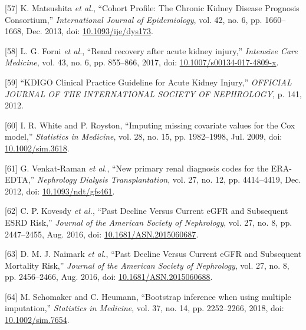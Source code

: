 \documentclass[
]{article}
\newenvironment{cslreferences}%
  {}%
  {\par}
\begin{document}
\begin{cslreferences}
\leavevmode\hypertarget{ref-matsushita_cohort_2013}{}%
{[}57{]} K. Matsushita \emph{et al.}, ``Cohort Profile: The Chronic Kidney Disease Prognosis Consortium,'' \emph{International Journal of Epidemiology}, vol. 42, no. 6, pp. 1660--1668, Dec. 2013, doi: \href{https://doi.org/10.1093/ije/dys173}{10.1093/ije/dys173}.

\leavevmode\hypertarget{ref-forni_renal_2017-1}{}%
{[}58{]} L. G. Forni \emph{et al.}, ``Renal recovery after acute kidney injury,'' \emph{Intensive Care Medicine}, vol. 43, no. 6, pp. 855--866, 2017, doi: \href{https://doi.org/10.1007/s00134-017-4809-x}{10.1007/s00134-017-4809-x}.

\leavevmode\hypertarget{ref-noauthor_kdigo_2012}{}%
{[}59{]} ``KDIGO Clinical Practice Guideline for Acute Kidney Injury,'' \emph{OFFICIAL JOURNAL OF THE INTERNATIONAL SOCIETY OF NEPHROLOGY}, p. 141, 2012.

\leavevmode\hypertarget{ref-white_imputing_2009}{}%
{[}60{]} I. R. White and P. Royston, ``Imputing missing covariate values for the Cox model,'' \emph{Statistics in Medicine}, vol. 28, no. 15, pp. 1982--1998, Jul. 2009, doi: \href{https://doi.org/10.1002/sim.3618}{10.1002/sim.3618}.

\leavevmode\hypertarget{ref-venkat-raman_new_2012}{}%
{[}61{]} G. Venkat-Raman \emph{et al.}, ``New primary renal diagnosis codes for the ERA-EDTA,'' \emph{Nephrology Dialysis Transplantation}, vol. 27, no. 12, pp. 4414--4419, Dec. 2012, doi: \href{https://doi.org/10.1093/ndt/gfs461}{10.1093/ndt/gfs461}.

\leavevmode\hypertarget{ref-kovesdy_past_2016}{}%
{[}62{]} C. P. Kovesdy \emph{et al.}, ``Past Decline Versus Current eGFR and Subsequent ESRD Risk,'' \emph{Journal of the American Society of Nephrology}, vol. 27, no. 8, pp. 2447--2455, Aug. 2016, doi: \href{https://doi.org/10.1681/ASN.2015060687}{10.1681/ASN.2015060687}.

\leavevmode\hypertarget{ref-naimark_past_2016}{}%
{[}63{]} D. M. J. Naimark \emph{et al.}, ``Past Decline Versus Current eGFR and Subsequent Mortality Risk,'' \emph{Journal of the American Society of Nephrology}, vol. 27, no. 8, pp. 2456--2466, Aug. 2016, doi: \href{https://doi.org/10.1681/ASN.2015060688}{10.1681/ASN.2015060688}.

\leavevmode\hypertarget{ref-schomaker_bootstrap_2018}{}%
{[}64{]} M. Schomaker and C. Heumann, ``Bootstrap inference when using multiple imputation,'' \emph{Statistics in Medicine}, vol. 37, no. 14, pp. 2252--2266, 2018, doi: \href{https://doi.org/10.1002/sim.7654}{10.1002/sim.7654}.


\end{cslreferences}
\end{document}
